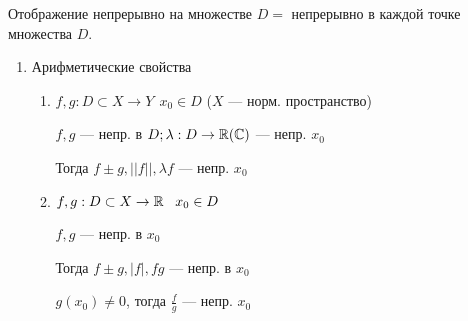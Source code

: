 \begin{definition}
    Отображение непрерывно на множестве $D = $ непрерывно в каждой точке множества $D$.
\end{definition}

    \begin{enumerate}
        \item Арифметические свойства
        \begin{enumerate}
            \item $f,g:D\subset X\to Y \ \ x_0\in D$ ($X$ --- норм. пространство)
            
            $f, g$ --- непр. в $D; \lambda:D\to\operatorname*{\mathbb{R}}(\operatorname*{\mathbb{C}})$ --- непр. $x_0$
            
            Тогда $f\pm g, ||f||, \lambda f$ --- непр. $x_0$

            \item $f,g:D\subset X\to \operatorname*{\mathbb{R}} \ \ x_0\in D$
            
            $f, g$ --- непр. в $x_0$

            Тогда $f\pm g, |f|, fg$ --- непр. в $x_0$

            $g(x_0)\not=0$, тогда $\frac{f}{g}$ --- непр. $x_0$
        \end{enumerate}
    \end{enumerate}

